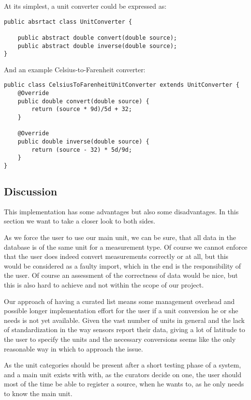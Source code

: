 At its simplest, a unit converter could be expressed as:

\begin{verbatim}
public absrtact class UnitConverter {

    public abstract double convert(double source);
    public abstract double inverse(double source);
}
\end{verbatim}

And an example Celsius-to-Farenheit converter:

\begin{verbatim}
public class CelsiusToFarenheitUnitConverter extends UnitConverter {
    @Override
    public double convert(double source) {
        return (source * 9d)/5d + 32;
    }

    @Override
    public double inverse(double source) {
        return (source - 32) * 5d/9d;
    }
}
\end{verbatim}

\subsection{Discussion}\label{discussion}

This implementation has some advantages but also some disadvantages. In
this section we want to take a closer look to both sides.

As we force the user to use our main unit, we can be sure, that all data
in the database is of the same unit for a measurement type. Of course we
cannot enforce that the user does indeed convert measurements correctly
or at all, but this would be considered as a faulty import, which in the
end is the responsibility of the user. Of course an assessment of the
correctness of data would be nice, but this is also hard to achieve and
not within the scope of our project.

Our approach of having a curated list means some management overhead and
possible longer implementation effort for the user if a unit conversion
he or she needs is not yet available. Given the vast number of units in
general and the lack of standardization in the way sensors report their
data, giving a lot of latitude to the user to specify the units and the
necessary conversions seems like the only reasonable way in which to
approach the issue.

As the unit categories should be present after a short testing phase of
a system, and a main unit exists with with, as the curators decide on
one, the user should most of the time be able to register a source, when
he wants to, as he only needs to know the main unit.

